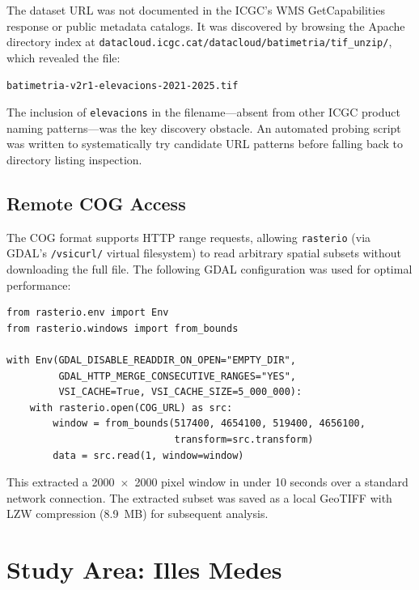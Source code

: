\documentclass[a4paper,11pt]{article}
\begin{document}
The dataset URL was not documented in the ICGC's WMS GetCapabilities response or
public metadata catalogs. It was discovered by browsing the Apache directory index at
\texttt{datacloud.icgc.cat/datacloud/batimetria/tif\_unzip/}, which revealed the file:

\begin{center}
\small\texttt{batimetria-v2r1-elevacions-2021-2025.tif}
\end{center}

The inclusion of \texttt{elevacions} in the filename---absent from other ICGC product
naming patterns---was the key discovery obstacle. An automated probing script was written
to systematically try candidate URL patterns before falling back to directory listing
inspection.

\subsection{Remote COG Access}

The COG format supports HTTP range requests, allowing \texttt{rasterio} (via GDAL's
\texttt{/vsicurl/} virtual filesystem) to read arbitrary spatial subsets without
downloading the full file. The following GDAL configuration was used for optimal
performance:

\begin{lstlisting}
from rasterio.env import Env
from rasterio.windows import from_bounds

with Env(GDAL_DISABLE_READDIR_ON_OPEN="EMPTY_DIR",
         GDAL_HTTP_MERGE_CONSECUTIVE_RANGES="YES",
         VSI_CACHE=True, VSI_CACHE_SIZE=5_000_000):
    with rasterio.open(COG_URL) as src:
        window = from_bounds(517400, 4654100, 519400, 4656100,
                             transform=src.transform)
        data = src.read(1, window=window)
\end{lstlisting}

This extracted a \num{2000}~$\times$~\num{2000} pixel window in under 10 seconds over a
standard network connection. The extracted subset was saved as a local GeoTIFF with LZW
compression (\SI{8.9}{MB}) for subsequent analysis.

\section{Study Area: Illes Medes}
\label{sec:study_area}
\end{document}
